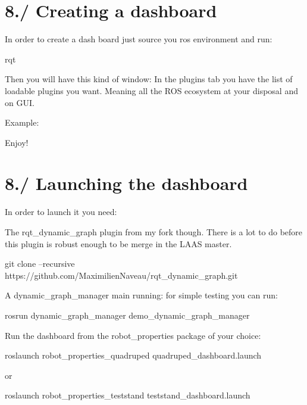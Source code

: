 \hypertarget{subpage_robot_dashboard_dashbaord_sec_create}{}\section{8./ Creating a dashboard}\label{subpage_robot_dashboard_dashbaord_sec_create}
In order to create a dash board just source you ros environment and run\+: 
\begin{DoxyCode}
rqt
\end{DoxyCode}
 Then you will have this kind of window\+:  In the plugins tab you have the list of loadable plugins you want. Meaning all the R\+OS ecosystem at your disposal and on G\+UI.

Example\+: 

Enjoy! \hypertarget{subpage_robot_dashboard_dashbaord_sec_launch}{}\section{8./ Launching the dashboard}\label{subpage_robot_dashboard_dashbaord_sec_launch}
In order to launch it you need\+:
\begin{DoxyItemize}
\item The rqt\+\_\+dynamic\+\_\+graph plugin from my fork though. There is a lot to do before this plugin is robust enough to be merge in the L\+A\+AS master. 
\begin{DoxyCode}
git clone --recursive https:\textcolor{comment}{//github.com/MaximilienNaveau/rqt\_dynamic\_graph.git}
\end{DoxyCode}

\item A dynamic\+\_\+graph\+\_\+manager main running\+: for simple testing you can run\+: 
\begin{DoxyCode}
rosrun dynamic\_graph\_manager demo\_dynamic\_graph\_manager
\end{DoxyCode}

\item Run the dashboard from the robot\+\_\+properties package of your choice\+: 
\begin{DoxyCode}
roslaunch robot\_properties\_quadruped quadruped\_dashboard.launch
\end{DoxyCode}
 or 
\begin{DoxyCode}
roslaunch robot\_properties\_teststand teststand\_dashboard.launch
\end{DoxyCode}
 
\end{DoxyItemize}